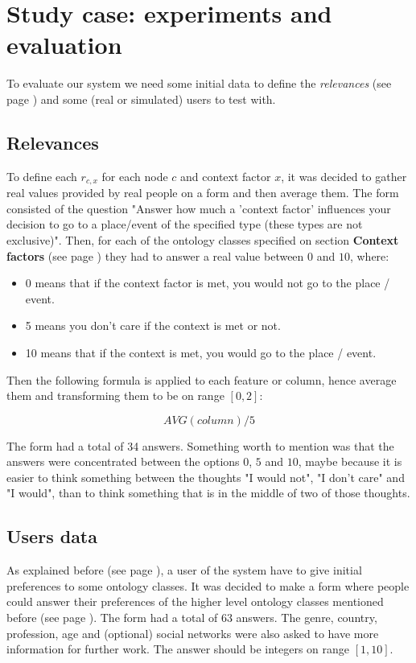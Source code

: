 \section{Study case: experiments and evaluation}
To evaluate our system we need some initial data to define the \textit{relevances} (see page \pageref{section:context-awareness}) and some (real or simulated) users to test with.

\subsection{Relevances}
To define each $r_{c,x}$ for each node $c$ and context factor $x$, it was decided to gather real values provided by real people on a form and then average them. The form consisted of the question "Answer how much a 'context factor' influences your decision to go to a place/event of the specified type (these types are not exclusive)". Then, for each of the ontology classes specified on section \textbf{Context factors} (see page \pageref{section:context_factors}) they had to answer a real value between $0$ and $10$, where:

\begin{itemize}
    \item $0$ means that if the context factor is met, you would not go to the place / event.
    \item 5 means you don't care if the context is met or not.
    \item 10 means that if the context is met, you would go to the place / event.
\end{itemize}

Then the following formula is applied to each feature or column, hence average them and transforming them to be on range $[0,2]$:

$$AVG(column)/5$$

The form had a total of 34 answers. Something worth to mention was that the answers were concentrated between the options $0$, $5$ and $10$, maybe because it is easier to think something between the thoughts "I would not", "I don't care" and "I would", than to think something that is in the middle of two of those thoughts.

\subsection{Users data}
As explained before (see page \pageref{section:preferences-propagation}), a user of the system have to give initial preferences to some ontology classes. It was decided to make a form where people could answer their preferences of the higher level ontology classes mentioned before (see page \pageref{section:context_factors}). The form had a total of 63 answers. The genre, country, profession, age and (optional) social networks were also asked to have more information for further work. The answer should be integers on range $[1, 10]$.

